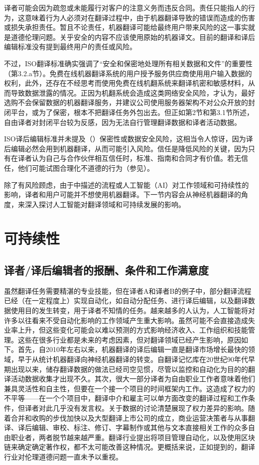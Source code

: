 \documentclass[output=paper]{langscibook}
\begin{document}
译者可能会因为疏忽或未能履行对客户的注意义务而违反合同。责任只能指人的行为，这意味着行为人必须对在翻译过程中，由于机器翻译导致的错误而造成的伤害或损失承担责任。暂且不论责任，机器翻译可能给最终用户带来风险的这一事实就是道德伦理问题。关乎安全的内容不应该使用原始的机器译文。目前的翻译和译后编辑标准没有提到最终用户的责任或风险。

不过，ISO翻译标准确实强调了“安全和保密地处理所有相关数据和文件”的重要性（\citealt{ISO2015}第3.2.a节）。免费在线机器翻译系统的用户授予服务供应商使用用户输入数据的权利，此外，还存在不经思考而使用免费在线机翻系统来翻译机密和敏感材料，从而导致数据泄露的情况。正因为机翻系统会造成这类网络安全风险，\citet{CanforaOttmann2020}才认为，最好选购不会保留数据的机器翻译服务，并建议公司使用服务器架构不对公众开放的封闭平台，或为了保密，根本不把翻译任务外包出去。但正如第2节和第3.1节所述，自由译者对封闭平台较为反感，因为无法自行管理翻译数据和译者活动数据。

ISO译后编辑标准并未提及（\citealt{ISO2017}）保密性或数据安全风险，这相当令人惊讶，因为译后编辑必然会用到机器翻译，从而可能引入风险。信任是降低风险的关键，因为只有在译者认为自己与合作伙伴相互信任时，标准、指南和合同才有价值。若无信任，他们可能试图合理化不道德的行为（参见\citealt{Abdallah2010}）。

除了有风险顾虑，由于中描述的流程或人工智能（AI）对工作领域和可持续性的影响，译者和用户可能并不想使用机器翻译。下一节内容会从神经机器翻译的角度，来深入探讨人工智能对翻译领域和可持续发展的影响。


\section{可持续性}\label{sec:moorkens:4}
\subsection{译者/译后编辑者的报酬、条件和工作满意度} 

虽然翻译任务需要精湛的专业技能，但在译者A和译者B的例子中，部分翻译流程已经（在一定程度上）实现自动化，如自动分配任务、进行译后编辑，以及翻译数据使用目的发生转变，用于译者不知情的任务。越来越多的人认为，人工智能将对许多以往看来不受自动化影响的工作领域产生重大影响。虽然可能不会直接造成失业率上升，但这些变化可能会以难以预测的方式影响经济收入、工作组织和技能管理。这些在很多行业都是未来的考虑因素，但对翻译领域已经产生影响，原因如下。首先，自2010年左右以来，机器翻译的译后编辑一直是翻译市场增长最快的领域，早于从统计机器翻译向神经机器翻译的转变。自翻译记忆库在20世纪90年代早期出现以来，储存翻译数据的做法已经司空见惯，尽管以监控和自动化为目的的翻译活动数据收集才出现不久。其次，很大一部分译者为自由职业工作者意味着他们兼具灵活性和自主性，但要在一个接一个项目的时间框架内工作。这造成了权力的不平等——在一个个项目中，翻译中介和雇主可以单方面改变的翻译过程和工作条件，但译者对此几乎没有发言权。关于数据的讨论清楚展现了权力差异的影响。随着合并和收购的步伐加快以及大型翻译上市公司的成立，商业运营决策者与从事翻译、译后编辑、审校、标注、修订、字幕制作或其他与文本直接相关工作的众多自由职业者，两者脱节越来越严重。翻译行业提出将项目管理自动化，以及使用区块链来确定确定著作权，都不太可能改善这种情况。更概括来说，正如\citet{MoorkensRocchi2021}提到的，翻译行业对伦理道德问题一直未予以重视。
\end{document}
